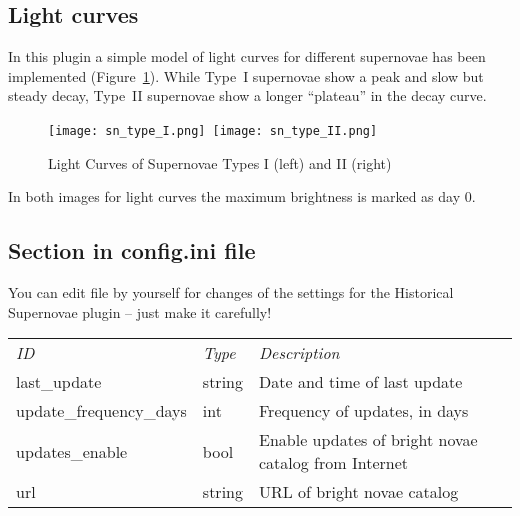 \subsection{Light curves}
\label{sec:plugins:HistoricalSupernovae:lightcurves}

In this plugin a simple model of light curves for different supernovae
has been implemented (Figure~\ref{fig:SNTypeI+II}). 
While Type~I supernovae show a peak and slow but steady decay, Type~II supernovae show a longer ``plateau'' in the decay curve.


\begin{figure}[ht]
\begin{center}
\texttt{[image: sn\_type\_I.png]}\,
\texttt{[image: sn\_type\_II.png]}
\end{center}
\caption{Light Curves of Supernovae Types I (left) and II (right)}
\label{fig:SNTypeI+II}
\end{figure}



In both images for light curves the maximum brightness is marked as day 0.

\subsection{Section  in config.ini file}

You can edit  file by yourself for changes of the
settings for the Historical Supernovae plugin -- just make it carefully!

\noindent%
\begin{tabularx}{\textwidth}{l|l|X}\toprule
\emph{ID}            & \emph{Type} & \emph{Description}\\%
last\_update            & string & Date and time of last update\\%
update\_frequency\_days & int    & Frequency of updates, in days\\%
updates\_enable         & bool   & Enable updates of bright novae catalog from Internet \\%
url                     & string & URL of bright novae catalog \\\bottomrule
\end{tabularx}

